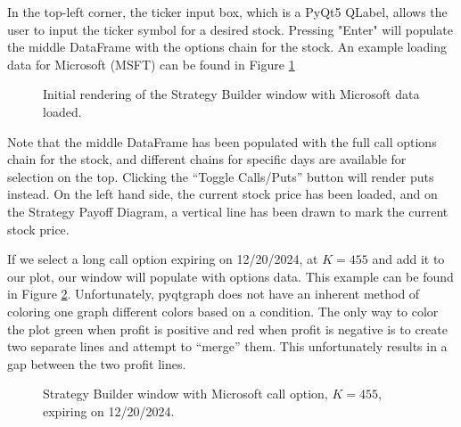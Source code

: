 \documentclass{article}
\begin{document}
In the top-left corner, the ticker input box, which is a PyQt5 QLabel, allows the user to input the ticker symbol for a desired stock. Pressing "Enter" will populate the middle DataFrame with the options chain for the stock. An example loading data for Microsoft (MSFT) can be found in Figure \ref{fig:Figure 8}

\begin{figure}[htbp]
    \centering
    \caption{\label{fig:Figure 8}Initial rendering of the Strategy Builder window with Microsoft data loaded.}
\end{figure}

Note that the middle DataFrame has been populated with the full call options chain for the stock, and different chains for specific days are available for selection on the top. Clicking the \enquote{Toggle Calls/Puts} button will render puts instead. On the left hand side, the current stock price has been loaded, and on the Strategy Payoff Diagram, a vertical line has been drawn to mark the current stock price. 

\indent If we select a long call option expiring on 12/20/2024, at $K=455$ and add it to our plot, our window will populate with options data. This example can be found in Figure \ref{fig:Figure 9}. Unfortunately, pyqtgraph does not have an inherent method of coloring one graph different colors based on a condition. The only way to color the plot green when profit is positive and red when profit is negative is to create two separate lines and attempt to \enquote{merge} them. This unfortunately results in a gap between the two profit lines.   

\begin{figure}[htbp]
    \centering
    \caption{\label{fig:Figure 9}Strategy Builder window with Microsoft call option, $K=455$, expiring on 12/20/2024.}
\end{figure}
\end{document}
